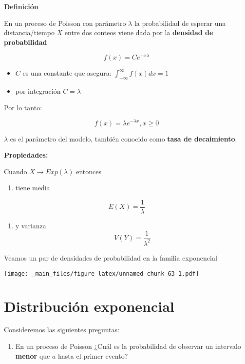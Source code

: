 \documentclass[
]{book}
\providecommand{\tightlist}{%
  \setlength{\itemsep}{0pt}\setlength{\parskip}{0pt}}
\begin{document}
\textbf{Definición}

En un proceso de Poisson con parámetro \(\lambda\) la probabilidad de esperar una distancia/tiempo \(X\) entre dos conteos viene dada por la \textbf{densidad de probabilidad}

\[f(x)= C e^{-x\lambda}\]

\begin{itemize}
\item
  \(C\) es una constante que asegura: \(\int_{-\infty}^{\infty} f(x) dx =1\)
\item
  por integración \(C=\lambda\)
\end{itemize}

Por lo tanto:

\[f(x)=\lambda e^{-\lambda x}, x\geq 0\]

\(\lambda\) es el parámetro del modelo, también conocido como \textbf{tasa de decaimiento}.

\textbf{Propiedades:}

Cuando \(X \rightarrow Exp(\lambda)\) entonces

\begin{enumerate}
\def\labelenumi{\arabic{enumi})}
\tightlist
\item
  tiene media
\end{enumerate}

\[E(X)=\frac{1}{\lambda}\]

\begin{enumerate}
\def\labelenumi{\arabic{enumi})}
\setcounter{enumi}{1}
\tightlist
\item
  y varianza
  \[V(Y)=\frac{1}{\lambda^2}\]
\end{enumerate}

Veamos un par de densidades de probabilidad en la familia exponencial

\texttt{[image: \_main\_files/figure-latex/unnamed-chunk-63-1.pdf]}

\hypertarget{distribuciuxf3n-exponencial}{%
\section{Distribución exponencial}\label{distribuciuxf3n-exponencial}}

Consideremos las siguientes preguntas:

\begin{enumerate}
\def\labelenumi{\arabic{enumi})}
\tightlist
\item
  En un proceso de Poisson ¿Cuál es la probabilidad de observar un intervalo \textbf{menor} que \(a\) hasta el primer evento?
\end{enumerate}
\end{document}
